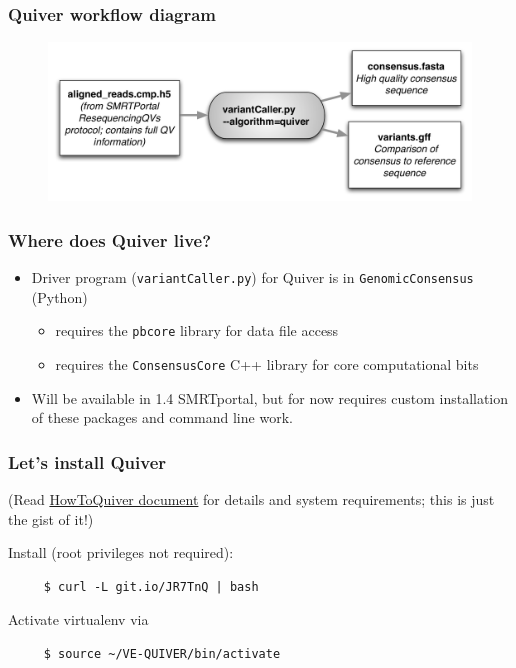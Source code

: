 \documentclass[11pt,serif]{beamer}
\begin{document}
\begin{frame}[fragile]\frametitle{Quiver workflow diagram}
\label{sec-1-4}

   \begin{figure}
   \centering
     \includegraphics[width=4.5in]{img/quiver-workflow}
   \end{figure}
\end{frame}
\begin{frame}[fragile]\frametitle{Where does Quiver live?}
\label{sec-1-5}

\begin{itemize}
\item Driver program (\verb~variantCaller.py~) for Quiver is in
     \verb~GenomicConsensus~ (Python)
\begin{itemize}
\item requires the \verb~pbcore~ library for data file access
\item requires the \verb~ConsensusCore~ C++ library for core computational
       bits
\end{itemize}
\item Will be available in 1.4 SMRTportal, but for now requires custom
     installation of these packages and command line work.
\end{itemize}
\end{frame}
\begin{frame}[fragile]\frametitle{Let's install Quiver}
\label{sec-1-6}

   (Read \href{https://github.com/PacificBiosciences/GenomicConsensus/blob/master/doc/HowToQuiver.rst}{HowToQuiver document}
   for details and system requirements; this is just the gist of it!) \newline

   Install (root privileges not required):
   \begin{verbatim}
     $ curl -L git.io/JR7TnQ | bash
   \end{verbatim}

   Activate virtualenv via
   \begin{verbatim}
     $ source ~/VE-QUIVER/bin/activate
   \end{verbatim}
\end{frame}
\end{document}
